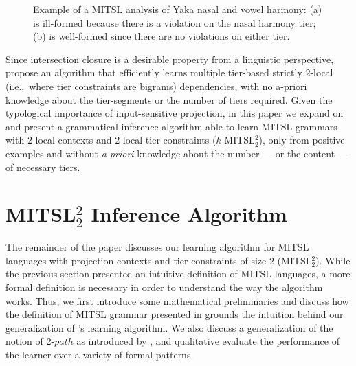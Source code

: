 \documentclass[11pt,a4paper]{article}
\begin{document}
\begin{figure}[]
\begin{center}
       
    
        \end{center}
        \caption{Example of a MITSL analysis of  Yaka nasal and vowel harmony: (a) is ill-formed because there is a violation on the nasal harmony tier; (b) is well-formed since there are no violations on either tier.}
        \label{fig:YAKA3}
        \end{figure}


Since intersection closure is a desirable property from a linguistic perspective, \citet{McMullinSCIL2019} propose an algorithm that efficiently learns multiple tier-based strictly $2$-local  (i.e.,~where tier constraints are bigrams) dependencies, with no a-priori knowledge about the tier-segments or the number of tiers required.
Given the typological importance of input-sensitive projection, in this paper we expand on \citet{McMullinSCIL2019} and present a grammatical inference algorithm able to learn MITSL grammars with $2$-local contexts and $2$-local tier constraints ($k$-MITSL$^2_2$), only from positive examples and without \emph{a priori} knowledge about the number --- or the content --- of necessary tiers.

\section{MITSL$^2_2$ Inference Algorithm}

The remainder of the paper discusses our learning algorithm for MITSL languages with projection contexts and tier constraints of size $2$ (MITSL$^2_2$).
While the previous section presented an intuitive definition of MITSL languages, a more formal definition is necessary in order to understand the way the algorithm works.
Thus, we first introduce some mathematical preliminaries and discuss how the definition of MITSL grammar presented in \citep{desanto2019structure}  grounds the intuition behind our generalization of \citet{McMullinSCIL2019}'s learning algorithm. 
We also discuss a generalization of the notion of  $2\text{-}path$ as introduced by \citet{JardineHeinz16}, and qualitative evaluate the performance of the learner over a variety of formal patterns.
\end{document}
